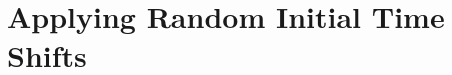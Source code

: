 \chapter[Applying Random Initial Time Shifts]{Applying Random Initial Time Shifts}
\label{cp:applying-random-initial-time-shifts}

